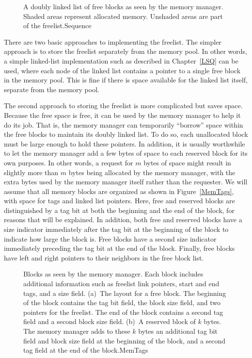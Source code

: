 \begin{figure}
\vspace{-\bigskipamount}
\vspace{-\smallskipamount}
{A doubly linked list of free blocks as seen by the memory
manager.
Shaded areas represent allocated memory.
Unshaded areas are part of the freelist.}{Sequence}
\smallskip
\end{figure}

There are two basic approaches to implementing the freelist.
The simpler approach is to store the freelist separately from the
memory pool.
In other words, a simple linked-list implementation such as described
in Chapter~\ref{LSQ} can be used, where each node of the linked list
contains a pointer to a single free block in the memory pool.
This is fine if there is space available for the linked list itself,
separate from the memory pool.

The second approach to storing the freelist is more complicated but
saves space.
Because the free space is free, it can be used by the memory manager
to help it do its job.
That is, the memory manager can temporarily
``borrow'' space within the free blocks to maintain its doubly
linked list.
To do so, each unallocated block must be large enough to hold these
pointers.
In addition, it is usually worthwhile to let the memory manager add a
few bytes of space to each reserved block for its own purposes.
In other words, a request for $m$ bytes of space might result in
slightly more than $m$ bytes being allocated by the memory manager,
with the extra bytes used by the memory manager itself rather than
the requester.
We will assume that all memory blocks are organized as shown in
Figure~\ref{MemTags}, with space for tags and linked list pointers.
Here, free and reserved blocks are distinguished by a tag bit at both
the beginning and the end of the block, for reasons that will be
explained.
In addition, both free and reserved blocks have a size indicator
immediately after the tag bit at the beginning of the block to
indicate how large the block is.
Free blocks have a second size indicator immediately preceding the tag
bit at the end of the block.
Finally, free blocks have left and right pointers to their neighbors
in the free block list.

\begin{figure}
\vspace{-\smallskipamount}
{Blocks as seen by the memory manager.
Each block includes additional information such as freelist link
pointers, start and end tags, and a size field.
(a)~The layout for a free block.
The beginning of the block contains the tag bit field, the block size
field, and two pointers for the freelist.
The end of the block contains a second tag field and a second block
size field.
(b)~A reserved block of $k$ bytes.
The memory manager adds to these $k$ bytes an additional tag bit field
and block size field at the beginning of the block, and a second tag
field at the end of the block.}{MemTags}
\bigskip
\end{figure}

